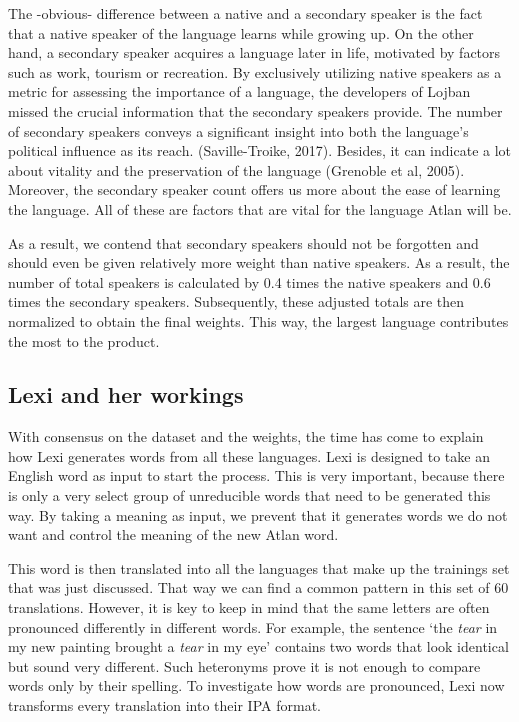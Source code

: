 The -obvious- difference between a native and a secondary speaker is the fact that a native speaker of the language learns while growing up. On the other hand, a secondary speaker acquires a language later in life, motivated by factors such as work, tourism or recreation. By exclusively utilizing native speakers as a metric for assessing the importance of a language, the developers of Lojban missed the crucial information that the secondary speakers provide. The number of secondary speakers conveys a significant insight into both the language's political influence as its reach. (Saville-Troike, 2017). Besides, it can indicate a lot about vitality and the preservation of the language (Grenoble et al, 2005). Moreover, the secondary speaker count offers us more about the ease of learning the language. All of these are factors that are vital for the language Atlan will be. 

As a result, we contend that secondary speakers should not be forgotten and should even be given relatively more weight than native speakers. As a result, the number of total speakers is calculated by 0.4 times the native speakers and 0.6 times the secondary speakers. Subsequently, these adjusted totals are then normalized to obtain the final weights. This way, the largest language contributes the most to the product. 

\subsection{Lexi and her workings}

\noindent With consensus on the dataset and the weights, the time has come to explain how Lexi generates words from all these languages. Lexi is designed to take an English word as input to start the process. This is very important, because there is only a very select group of unreducible words that need to be generated this way. By taking a meaning as input, we prevent that it generates words we do not want and control the meaning of the new Atlan word. 

This word is then translated into all the languages that make up the trainings set that was just discussed. That way we can find a common pattern in this set of 60 translations. However, it is key to keep in mind that the same letters are often pronounced differently in different words. For example, the sentence ‘the \textit{tear} in my new painting brought a \textit{tear} in my eye’ contains two words that look identical but sound very different. Such heteronyms prove it is not enough to compare words only by their spelling. To investigate how words are pronounced, Lexi now transforms every translation into their IPA format. 


